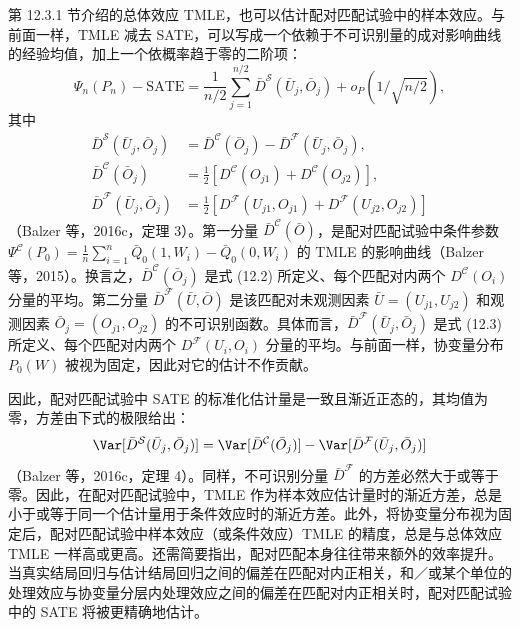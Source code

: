 第 12.3.1 节介绍的总体效应 TMLE，也可以估计配对匹配试验中的样本效应。与前面一样，TMLE 减去 SATE，可以写成一个依赖于不可识别量的成对影响曲线的经验均值，加上一个依概率趋于零的二阶项：
\[
\Psi_n(P_n)-\mathrm{SATE}
=\frac1{n/2}\sum_{j=1}^{n/2}\bar D^{\mathcal S}(\bar U_j,\bar O_j)
+o_P(1/\sqrt{n/2}),
\]
其中
\[
\begin{aligned}
\bar D^{\mathcal S}(\bar U_j,\bar O_j)
&=\bar D^{\mathcal C}(\bar O_j)-\bar D^{\mathcal F}(\bar U_j,\bar O_j),\\
\bar D^{\mathcal C}(\bar O_j)
&=\frac12[D^{\mathcal C}(O_{j1})+D^{\mathcal C}(O_{j2})],\\
\bar D^{\mathcal F}(\bar U_j,\bar O_j)
&=\frac12[D^{\mathcal F}(U_{j1},O_{j1})+D^{\mathcal F}(U_{j2},O_{j2})]
\end{aligned}
\]
（Balzer 等，2016c，定理 3）。第一分量 $\bar D^{\mathcal C}(\bar O)$，是配对匹配试验中条件参数 $\Psi^{\mathcal C}(P_0)=\frac1n\sum_{i=1}^n\bar Q_0(1,W_i)-\bar Q_0(0,W_i)$ 的 TMLE 的影响曲线（Balzer 等，2015）。换言之，$\bar D^{\mathcal C}(\bar O_j)$ 是式 (12.2) 所定义、每个匹配对内两个 $D^{\mathcal C}(O_i)$ 分量的平均。第二分量 $\bar D^{\mathcal F}(\bar U,\bar O)$ 是该匹配对未观测因素 $\bar U=(U_{j1},U_{j2})$ 和观测因素 $\bar O_j=(O_{j1},O_{j2})$ 的不可识别函数。具体而言，$\bar D^{\mathcal F}(\bar U_j,\bar O_j)$ 是式 (12.3) 所定义、每个匹配对内两个 $D^{\mathcal F}(U_i,O_i)$ 分量的平均。与前面一样，协变量分布 $P_0(W)$ 被视为固定，因此对它的估计不作贡献。

因此，配对匹配试验中 SATE 的标准化估计量是一致且渐近正态的，其均值为零，方差由下式的极限给出：
\[
\Var[\bar D^{\mathcal S}(\bar U_j,\bar O_j)]
=\Var[\bar D^{\mathcal C}(\bar O_j)]
-\Var[\bar D^{\mathcal F}(\bar U_j,\bar O_j)]
\]
（Balzer 等，2016c，定理 4）。同样，不可识别分量 $\bar D^{\mathcal F}$ 的方差必然大于或等于零。因此，在配对匹配试验中，TMLE 作为样本效应估计量时的渐近方差，总是小于或等于同一个估计量用于条件效应时的渐近方差。此外，将协变量分布视为固定后，配对匹配试验中样本效应（或条件效应）TMLE 的精度，总是与总体效应 TMLE 一样高或更高。还需简要指出，配对匹配本身往往带来额外的效率提升。当真实结局回归与估计结局回归之间的偏差在匹配对内正相关，和／或某个单位的处理效应与协变量分层内处理效应之间的偏差在匹配对内正相关时，配对匹配试验中的 SATE 将被更精确地估计。

